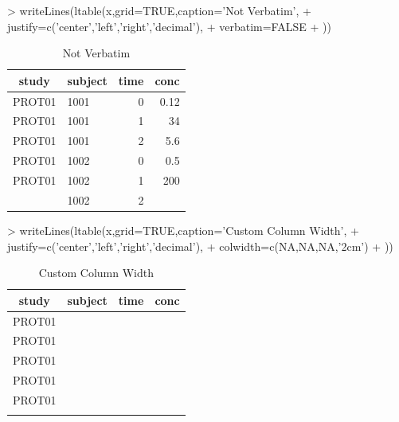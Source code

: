 \documentclass[titlepage]{article}
\begin{document}
\begin{Schunk}
\begin{Sinput}
> writeLines(ltable(x,grid=TRUE,caption='Not Verbatim',
+     justify=c('center','left','right','decimal'),
+     verbatim=FALSE
+ ))
\end{Sinput}
\begin{table}[!htpb]
 \caption[Not Verbatim]{Not Verbatim }
 \begin{center}
  \begin{tabular}{c|l|r|r}
    \hline \hline
   study & subject & time & conc \\ \hline
   PROT01 & 1001 & 0 & 0.12 \\ \hline
   PROT01 & 1001 & 1 & 34    \\ \hline
   PROT01 & 1001 & 2 & 5.6  \\ \hline
   PROT01 & 1002 & 0 & 0.5  \\ \hline
   PROT01 & 1002 & 1 & 200    \\ \hline
    & 1002 & 2 &  \\ \hline
  \end{tabular}
 \end{center}
\end{table}\end{Schunk}
\begin{Schunk}
\begin{Sinput}
> writeLines(ltable(x,grid=TRUE,caption='Custom Column Width',
+     justify=c('center','left','right','decimal'),
+     colwidth=c(NA,NA,NA,'2cm')
+ ))
\end{Sinput}
\begin{table}[!htpb]
 \caption[Custom Column Width]{Custom Column Width }
 \begin{center}
  \begin{tabular}{c|l|r|p{2cm}}
    \hline \hline
   study & subject & time & conc \\ \hline
   PROT01 & \verb#1001# & \verb#0# & \verb#0.12# \\ \hline
   PROT01 & \verb#1001# & \verb#1# & \verb#34   # \\ \hline
   PROT01 & \verb#1001# & \verb#2# & \verb#5.6 # \\ \hline
   PROT01 & \verb#1002# & \verb#0# & \verb#0.5 # \\ \hline
   PROT01 & \verb#1002# & \verb#1# & \verb#200   # \\ \hline
    & \verb#1002# & \verb#2# & \verb## \\ \hline
  \end{tabular}
 \end{center}
\end{table}\end{Schunk}
\end{document}
